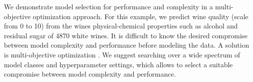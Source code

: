 \documentclass[runningheads]{llncs}\usepackage[]{graphicx}\usepackage[]{color}
\begin{document}
%
%

%
%
%

%

%
%

We demonstrate model selection for performance and complexity in a multi-objective optimization approach.
For this example, we predict wine quality (scale from 0 to 10) \citep{cortez2009modeling} from the wines physical-chemical properties such as alcohol and residual sugar of 4870 white wines.
It is difficult to know the desired compromise between model complexity and performance before modeling the data.
A solution is multi-objective optimization \citep{freitas2014comprehensible}.
We suggest searching over a wide spectrum of model classes and hyperparameter settings, which allows to select a suitable compromise between model complexity and performance.
\end{document}
